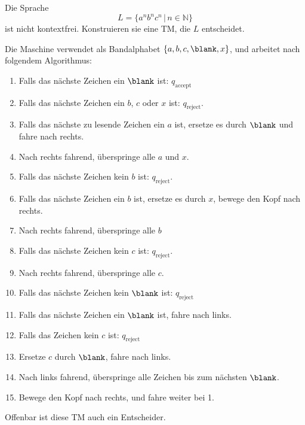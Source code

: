 Die Sprache
\[
L=\{a^nb^nc^n\,|\,n\in \mathbb N\}
\]
ist nicht kontextfrei. Konstruieren sie eine TM, die $L$
entscheidet.

\begin{loesung}
Die Maschine verwendet als Bandalphabet $\{a,b,c,\blank,x\}$,
und arbeitet nach folgendem Algorithmus:
\begin{enumerate}
\item Falls das nächste Zeichen ein $\blank$ ist:
$q_{\text{accept}}$
\item Falls das nächste Zeichen ein $b$, $c$ oder $x$ ist:
$q_{\text{reject}}$.
\item Falls das nächste zu lesende Zeichen ein $a$ ist, ersetze
es durch $\blank$ und fahre nach rechts.
\item Nach rechts fahrend, überspringe alle $a$ und $x$.
\item Falls das nächste Zeichen kein $b$ ist:
$q_{\text{reject}}$.
\item Falls das nächste Zeichen ein $b$ ist, ersetze es durch $x$,
bewege den Kopf nach rechts.
\item Nach rechts fahrend, überspringe alle $b$
\item Falls das nächste Zeichen kein $c$ ist:
$q_{\text{reject}}$.
\item Nach rechts fahrend, überspringe alle $c$.
\item Falls das nächste Zeichen kein $\blank$ ist: $q_{\text{reject}}$
\item Falls das nächste Zeichen ein $\blank$ ist, fahre nach
links.
\item Falls das Zeichen kein $c$ ist: $q_{\text{reject}}$
\item Ersetze $c$ durch $\blank$, fahre nach links.
\item Nach links fahrend, überspringe alle Zeichen bis zum nächsten
$\blank$.
\item Bewege den Kopf nach rechts, und fahre weiter bei 1.
\end{enumerate}
Offenbar ist diese TM auch ein Entscheider.


\end{loesung}

